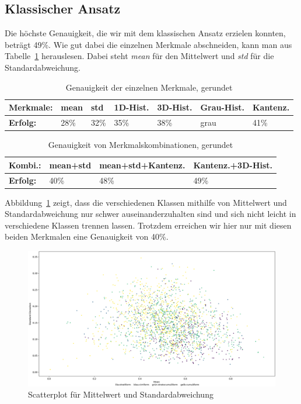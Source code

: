 \documentclass[a4,german]{article}
\begin{document}
\subsection{Klassischer Ansatz}%
Die höchste Genauigkeit, die wir mit dem klassischen Ansatz erzielen konnten, beträgt 49\%. Wie gut dabei die einzelnen Merkmale abschneiden, kann man aus Tabelle~\ref{tab:gen} herauslesen. Dabei steht \textit{mean} für den Mittelwert und \textit{std} für die Standardabweichung. 
\begin{table}[h]
\begin{tabular}{|l|l|l|l|l|l|l|}
 \hline
 \textbf{Merkmale:}&mean&std&1D-Hist.&3D-Hist.&Grau-Hist.&Kantenz.\\
 \hline
 \textbf{Erfolg:} & 28\% & 32\% & 35\% & 38\% & grau & 41\% \\
 \hline
\end{tabular}
\caption{Genauigkeit der einzelnen Merkmale, gerundet}
\label{tab:gen}
\end{table}

\begin{table}[h]
\begin{tabular}{|l|l|l|l|}
 \hline
 \textbf{Kombi.:}&mean+std&mean+std+Kantenz.&Kantenz.+3D-Hist.\\
 \hline
 \textbf{Erfolg:} & 40\% & 48\% & 49\% \\
 \hline
\end{tabular}
\caption{Genauigkeit von Merkmalskombinationen, gerundet}
\label{tab:gen2}
\end{table}

Abbildung~\ref{fig:meanstd} zeigt, dass die verschiedenen Klassen mithilfe von Mittelwert und Standardabweichung nur schwer auseinanderzuhalten sind und sich nicht leicht in verschiedene Klassen trennen lassen. Trotzdem erreichen wir hier nur mit diesen beiden Merkmalen eine Genauigkeit von 40\%.
\begin{figure}[h!]
\hspace*{-3cm}
\includegraphics[width=1.5\textwidth]{Scatterplot_mean_std.png}
\caption{Scatterplot für Mittelwert und Standardabweichung}
\label{fig:meanstd}
\end{figure}
\end{document}
